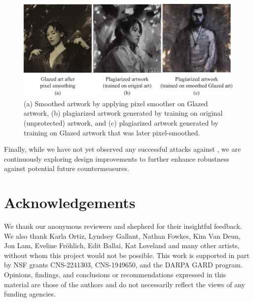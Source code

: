 \begin{figure}[t]
  \centering
  \includegraphics[width=0.90\columnwidth]{plots/counter/smoother.pdf}
  \vspace{-0.1in}
  \caption{ (a) Smoothed artwork by applying pixel smoother on Glazed
    artwork, (b) plagiarized artwork generated by training on original
    (unprotected) artwork, and (c) plagiarized artwork generated by training
    on Glazed artwork that was later pixel-smoothed.} 
  \label{fig:smooth-attack}
\end{figure}

Finally, while we have not yet observed any successful attacks against \system{},
we are continuously exploring design improvements to further enhance
robustness against potential future countermeasures.

\section*{Acknowledgements} We thank our anonymous reviewers and shepherd for
their insightful feedback. We also thank Karla Ortiz, Lyndsey Gallant, Nathan
Fowkes, Kim Van Deun, Jon Lam, Eveline Fr\"ohlich, Edit Ballai, Kat Loveland and many
other artists, without whom this project would not be possible. This work is
supported in part by NSF grants CNS-2241303, CNS-1949650, and the DARPA GARD
program.  Opinions, findings, and conclusions or recommendations expressed in
this material are those of the authors and do not necessarily reflect the
views of any funding agencies.

